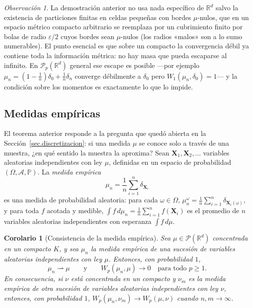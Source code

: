 \documentclass[12pt, a4paper]{amsbook}
\newcommand{\R}{{\mathbb R}}
\renewcommand{\P}{{\mathbb P}}
\newcommand{\A}{{\mathcal A}}
\newtheorem{cor}[teo]{Corolario}
\theoremstyle{remark}
\newtheorem{obs}[teo]{Observación}
\theoremstyle{definition}
\numberwithin{section}{chapter}
\numberwithin{subsection}{section}
\numberwithin{equation}{section}
\numberwithin{figure}{chapter}
\begin{document}
\begin{obs}
La demostración anterior no usa nada específico de $\R^d$ salvo la
existencia de particiones finitas en celdas pequeñas con bordes $\mu$-nulos,
que en un espacio métrico compacto arbitrario se reemplaza por un cubrimiento
finito por bolas de radio $\varepsilon/2$ cuyos bordes sean $\mu$-nulos (los
radios «malos» son a lo sumo numerables). El punto esencial es que sobre un
compacto la convergencia débil ya contiene toda la información métrica: no
hay masa que pueda escaparse al infinito. En $\mathcal P_p(\R^d)$ general
ese escape es posible —por ejemplo $\mu_n=(1-\tfrac1n)\delta_0+\tfrac1n\delta_{n}$
converge débilmente a $\delta_0$ pero $W_1(\mu_n,\delta_0)=1$— y la condición
sobre los momentos es exactamente lo que lo impide.
\end{obs}

\subsection*{Medidas empíricas}

El teorema anterior responde a la pregunta que quedó abierta en la
Sección~\ref{sec.discretizacion}: si una medida $\mu$ se conoce solo a
través de una muestra, ¿en qué sentido la muestra la aproxima? Sean
$\mathbf X_1,\mathbf X_2,\dots$ variables aleatorias independientes con ley
$\mu$, definidas en un espacio de probabilidad $(\Omega,\A,\P)$. La
\emph{medida empírica}
\[
\mu_n=\frac1n\sum_{i=1}^n\delta_{\mathbf X_i}
\]
es una medida de probabilidad aleatoria: para cada $\omega\in\Omega$,
$\mu_n^\omega=\frac1n\sum_{i=1}^n\delta_{\mathbf X_i(\omega)}$, y para toda
$f$ acotada y medible, $\int f\,d\mu_n=\frac1n\sum_{i=1}^nf(\mathbf X_i)$ es
el promedio de $n$ variables aleatorias independientes con esperanza
$\int f\,d\mu$.

\begin{cor}[Consistencia de la medida empírica]\label{cor.Wp.empirica}
Sea $\mu\in\mathcal P(\R^d)$ concentrada en un compacto $K$, y sea $\mu_n$ la
medida empírica de una sucesión de variables aleatorias independientes con
ley $\mu$. Entonces, con probabilidad $1$,
\[
\mu_n\rightharpoonup\mu
\qquad\text{y}\qquad
W_p(\mu_n,\mu)\longrightarrow0\quad\text{para todo }p\ge1.
\]
En consecuencia, si $\nu$ está concentrada en un compacto y $\nu_m$ es la
medida empírica de otra sucesión de variables aleatorias independientes con
ley $\nu$, entonces, con probabilidad $1$,
$W_p(\mu_n,\nu_m)\to W_p(\mu,\nu)$ cuando $n,m\to\infty$.
\end{cor}
\end{document}
